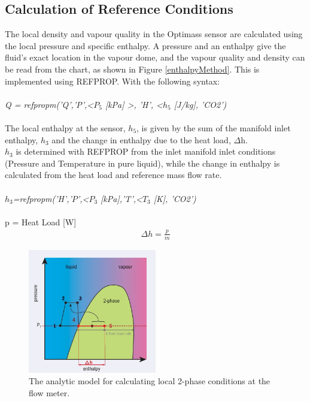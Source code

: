 \documentclass{report}
\begin{document}
\subsection{Calculation of Reference Conditions}
The local density and vapour quality in the Optimass sensor are calculated using the local pressure and specific enthalpy. 
A pressure and an enthalpy give the fluid's exact location in the vapour dome, and the vapour quality and density can be read from the chart, as shown in Figure \ref{enthalpyMethod}. This is implemented using REFPROP. With the following syntax: \\\\
\textit{Q = refpropm('Q','P',<$P_5$ [kPa] >, 'H', <$h_5$ [J/kg], 'CO2')} \\\\
The local enthalpy at the sensor, \textit{$h_5$}, is given by the sum of the manifold inlet enthalpy, $h_3$ and the change in enthalpy due to the heat load, $\Delta$h.\\
\textit{$h_3$} is determined with REFPROP from the inlet manifold inlet conditions (Pressure and Temperature in pure liquid), while the change in enthalpy is calculated from the heat load and reference mass flow rate.\\\\
\textit{$h_3$=refpropm('H','$P$',<$P_3$ [kPa],'T',<$T_3$ [K], 'CO2')}\\\\
p = Heat Load [W]\\
\begin{eqnarray}
\Delta h=\frac{p}{\dot{m}}
\end{eqnarray}
\begin{figure}
\includegraphics[width=0.5\textwidth]{enthalpyMethod.jpg}
\caption{The analytic model for calculating local 2-phase conditions at the flow meter.}
\label{fig:enthalpyMethod}
\end{figure}
\end{document}
